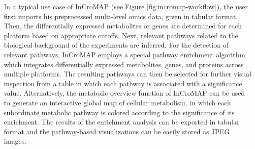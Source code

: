 \documentclass[final,5p,times,twocolumn]{elsarticle}
\begin{document}
In a typical use case of InCroMAP (see Figure \ref{fig:incromap-workflow}), the user first imports his preprocessed multi-level omics data, given in tabular format. Then, the differentially expressed metabolites or genes are determined for each platform based on appropriate cutoffs. Next, relevant pathways related to the biological background of the experiments are inferred. For the detection of relevant pathways, InCroMAP employs a special pathway enrichment algorithm which integrates differentially expressed metabolites, genes, and proteins across multiple platforms. The resulting pathways can then be selected for further visual inspection from a table in which each pathway is associated with a significance value. Alternatively, the metabolic overview function of InCroMAP can be used to generate an interactive global map of cellular metabolism, in which each subordinate metabolic pathway is colored according to the significance of its enrichment. The results of the enrichment analysis can be exported in tabular format and the pathway-based visualizations can be easily stored as JPEG images.
\end{document}
